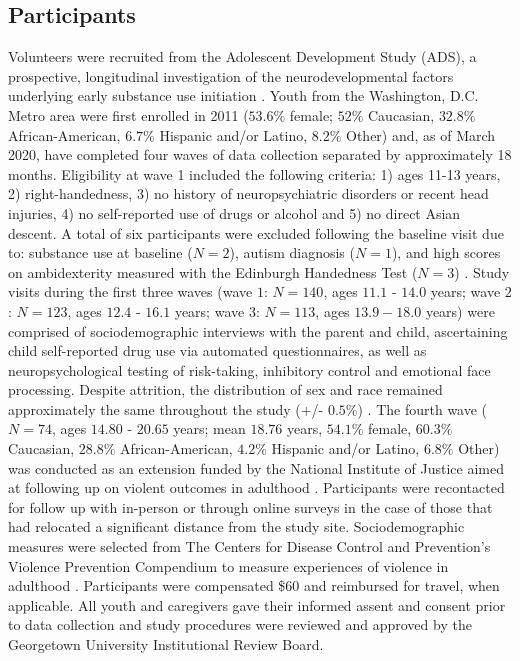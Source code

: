 \documentclass[utf8]{frontiersSCNS} %
\begin{document}
\subsection{Participants} Volunteers were recruited from the Adolescent Development Study (ADS), a prospective, longitudinal investigation of the neurodevelopmental factors underlying early substance use initiation \citep{Fishbein2016}. Youth from the Washington, D.C. Metro area were first enrolled in 2011 ($53.6\%$ female; $52\%$ Caucasian, $32.8\%$ African-American, $6.7\%$ Hispanic and/or Latino, $8.2\%$ Other) and, as of March 2020, have completed four waves of data collection separated by approximately 18 months. Eligibility at wave 1 included the following criteria: 1) ages 11-13 years, 2) right-handedness, 3) no history of neuropsychiatric disorders or recent head injuries, 4) no self-reported use of drugs or alcohol and 5) no direct Asian descent. A total of six participants were excluded following the baseline visit due to: substance use at baseline ($N=2$), autism diagnosis ($N=1$), and high scores on ambidexterity measured with the Edinburgh Handedness Test ($N=3$) \citep{veale2014edinburgh}. Study visits during the first three waves (wave $1$: $N=140$, ages $11.1$ - $14.0$ years; wave $2$:  $N=123$, ages $12.4$ - $16.1$ years; wave $3$: $N=113$, ages $13.9 - 18.0$ years) were comprised of sociodemographic interviews with the parent and child, ascertaining child self-reported drug use via automated questionnaires, as well as neuropsychological testing of risk-taking, inhibitory control and emotional face processing. Despite attrition, the distribution of sex and race remained approximately the same throughout the study (+/- $0.5\%$) . The fourth wave ($N=74$, ages $14.80$ - $20.65$ years; mean $18.76$ years, $54.1\%$ female, $60.3\%$ Caucasian, $28.8\%$ African-American, $4.2\%$ Hispanic and/or Latino, $6.8\%$ Other) was conducted as an extension funded by the National Institute of Justice aimed at following up on violent outcomes in adulthood \citep{ElDamaty2016NIJ}. Participants were recontacted for follow up with in-person or through online surveys in the case of those that had relocated a significant distance from the study site. Sociodemographic measures were selected from The Centers for Disease Control and Prevention’s Violence Prevention Compendium to measure experiences of violence in adulthood \citep{dahlberg2005measuring}. Participants were compensated \$$60$ and reimbursed for travel, when applicable. All youth and caregivers gave their informed assent and consent prior to data collection and study procedures were reviewed and approved by the Georgetown University Institutional Review Board.
\end{document}
